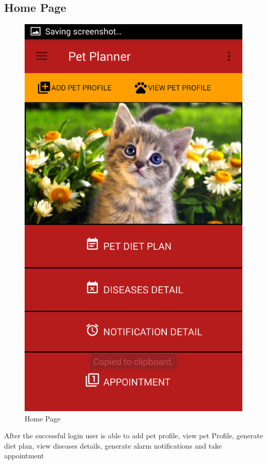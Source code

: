 \newpage
\subsection{Home Page}
\begin{figure}[H] 
  \centering
    \includegraphics[scale=0.3]{89HomePage}
     \caption{Home Page}
\end{figure}
After the successful login user is able to add pet profile, view pet
 Profile, generate diet plan, view diseases details, generate alarm notifications and take appointment

